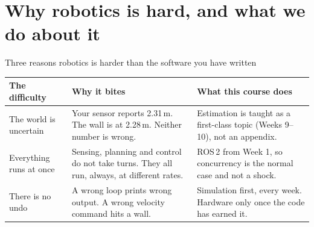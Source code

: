 \documentclass[aspectratio=169]{beamer}
\begin{document}
\section{Why robotics is hard, and what we do about it}

\begin{frame}{Three reasons robotics is harder than the software you have written}
  \small
  \begin{table}
    \begin{tabular}{@{}p{3.1cm}p{4.0cm}p{4.4cm}@{}}
      \toprule
      \textbf{The difficulty} & \textbf{Why it bites} & \textbf{What this course does} \\
      \midrule
      The world is \newline uncertain
        & Your sensor reports 2.31\,m. The wall is at 2.28\,m. Neither number is wrong.
        & Estimation is taught as a first-class topic (Weeks 9--10), not an appendix. \\[0.4em]
      Everything runs \newline at once
        & Sensing, planning and control do not take turns. They all run, always, at
          different rates.
        & ROS\,2 from Week 1, so concurrency is the normal case and not a shock. \\[0.4em]
      There is no undo
        & A wrong loop prints wrong output. A wrong velocity command hits a wall.
        & Simulation first, every week. Hardware only once the code has earned it. \\
      \bottomrule
    \end{tabular}
  \end{table}
\end{frame}
\end{document}
